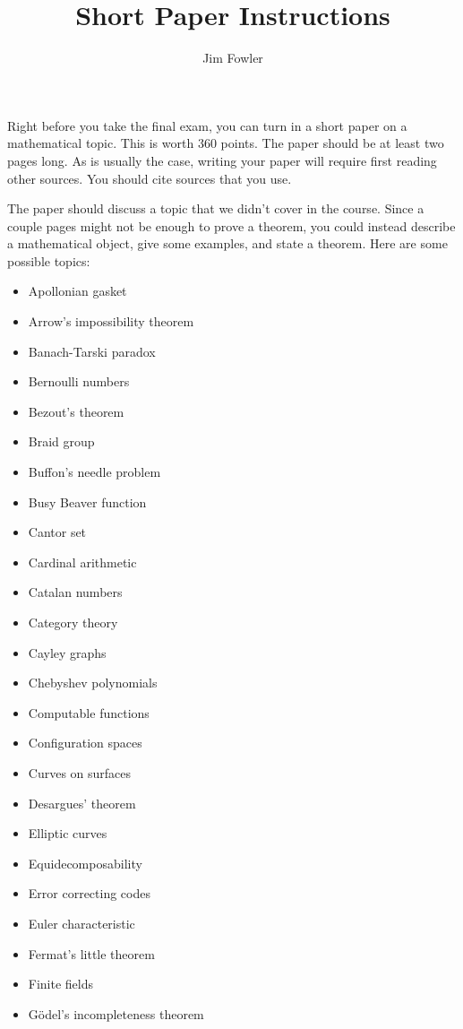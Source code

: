 \documentclass[12pt]{handout}
\title{Short Paper Instructions}
\author{Jim Fowler}
\begin{document}
\maketitle

Right before you take the final exam, you can turn in a short paper on
a mathematical topic.  This is worth 360 points.  The paper should be
at least two pages long.  As is usually the case, writing your paper
will require first reading other sources.  You should cite sources
that you use.

The paper should discuss a topic that we didn't cover in the course.
Since a couple pages might not be enough to prove a theorem, you could
instead describe a mathematical object, give some examples, and state
a theorem.  Here are some possible topics:
\setlength{\itemsep}{0ex}

\begin{multicols}{3}
  \begin{itemize}
  \item Apollonian gasket
  \item Arrow's impossibility theorem
  \item Banach-Tarski paradox
  \item Bernoulli numbers
  \item Bezout's theorem
  \item Braid group
  \item Buffon's needle problem
  \item Busy Beaver function
  \item Cantor set
  \item Cardinal arithmetic
  \item Catalan numbers
  \item Category theory
  \item Cayley graphs
  \item Chebyshev polynomials
  \item Computable functions
  \item Configuration spaces
  \item Curves on surfaces
  \item Desargues' theorem
  \item Elliptic curves
  \item Equidecomposability
  \item Error correcting codes
  \item Euler characteristic
  \item Fermat's little theorem
  \item Finite fields
  \item G\"odel's incompleteness theorem

\end{itemize}
\end{multicols}
\end{document}
